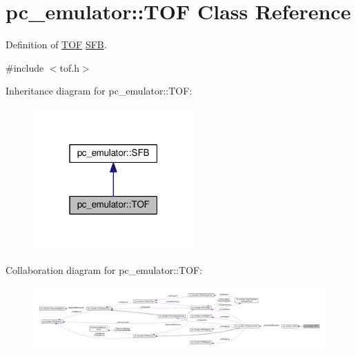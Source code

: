 \hypertarget{classpc__emulator_1_1TOF}{}\section{pc\+\_\+emulator\+:\+:T\+OF Class Reference}
\label{classpc__emulator_1_1TOF}


Definition of \hyperlink{classpc__emulator_1_1TOF}{T\+OF} \hyperlink{classpc__emulator_1_1SFB}{S\+FB}.  




{\ttfamily \#include $<$tof.\+h$>$}



Inheritance diagram for pc\+\_\+emulator\+:\+:T\+OF\+:\nopagebreak
\begin{figure}[H]
\begin{center}
\leavevmode
\includegraphics[width=175pt]{classpc__emulator_1_1TOF__inherit__graph}
\end{center}
\end{figure}


Collaboration diagram for pc\+\_\+emulator\+:\+:T\+OF\+:\nopagebreak
\begin{figure}[H]
\begin{center}
\leavevmode
\includegraphics[width=350pt]{classpc__emulator_1_1TOF__coll__graph}
\end{center}
\end{figure}
